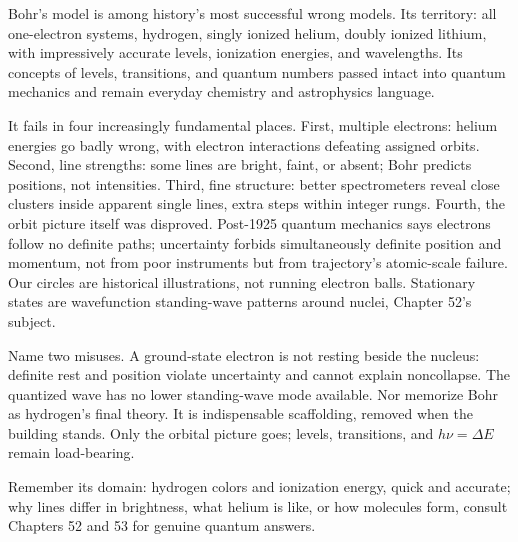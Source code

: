 
\begin{mainline}
Bohr's model is among history's most successful wrong models. Its territory: all one-electron systems, hydrogen, singly ionized helium, doubly ionized lithium, with impressively accurate levels, ionization energies, and wavelengths. Its concepts of levels, transitions, and quantum numbers passed intact into quantum mechanics and remain everyday chemistry and astrophysics language.

It fails in four increasingly fundamental places. First, multiple electrons: helium energies go badly wrong, with electron interactions defeating assigned orbits. Second, line strengths: some lines are bright, faint, or absent; Bohr predicts positions, not intensities. Third, fine structure: better spectrometers reveal close clusters inside apparent single lines, extra steps within integer rungs. Fourth, the orbit picture itself was disproved. Post-1925 quantum mechanics says electrons follow no definite paths; uncertainty forbids simultaneously definite position and momentum, not from poor instruments but from trajectory's atomic-scale failure. Our circles are historical illustrations, not running electron balls. Stationary states are wavefunction standing-wave patterns around nuclei, Chapter 52's subject.

Name two misuses. A ground-state electron is not resting beside the nucleus: definite rest and position violate uncertainty and cannot explain noncollapse. The quantized wave has no lower standing-wave mode available. Nor memorize Bohr as hydrogen's final theory. It is indispensable scaffolding, removed when the building stands. Only the orbital picture goes; levels, transitions, and \(h\nu=\Delta E\) remain load-bearing.

Remember its domain: hydrogen colors and ionization energy, quick and accurate; why lines differ in brightness, what helium is like, or how molecules form, consult Chapters 52 and 53 for genuine quantum answers.
\end{mainline}



